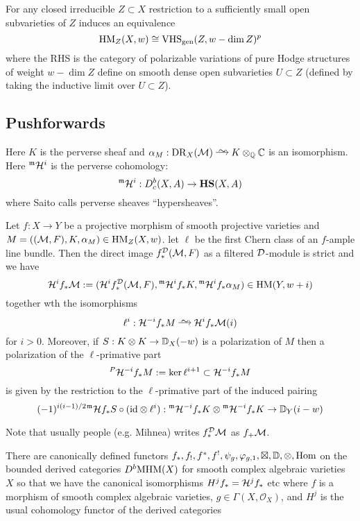 \documentclass[12pt]{article}
\newcommand{\cO}{\mathcal{O}}
\begin{document}
\begin{theorem}
For any closed irreducible $Z \subset X$ restriction to a sufficiently small open subvarieties of $Z$ induces an equivalence
\[ \mathrm{HM}_Z(X, w) \cong \mathrm{VHS}_{\text{gen}}(Z, w - \dim{Z})^p \]
where the RHS is the category of polarizable variations of pure Hodge structures of weight $w - \dim{Z}$ define on smooth dense open subvarieties $U \subset Z$ (defined by taking the inductive limit over $U \subset Z$).
\end{theorem}

\subsection{Pushforwards}

Here $K$ is the perverse sheaf and $\alpha_M : \DR_X(\cM) \iso K \ot_{\Q} \CC$ is an isomorphism. Here ${}^{\mathfrak{m}} \mathcal{H}^i$ is the perverse cohomology:
\[ {}^{\mathfrak{m}} \mathcal{H}^i : D_c^b(X, A) \to \mathbf{HS}(X, A) \]
where Saito calls perverse sheaves ``hypersheaves''. 

\begin{theorem}
Let $f : X \to Y$ be a projective morphism of smooth projective varieties and $M = ((\mathcal{M}, F), K, \alpha_M) \in \mathrm{HM}_Z(X, w)$. let $\ell$ be the first Chern class of an $f$-ample line bundle. Then the direct image $f_*^{\mathcal{D}}(\mathcal{M}, F)$ as a filtered $\mathcal{D}$-module is strict and we have
\[ \mathcal{H}^i f_* \mathcal{M} := (\mathcal{H}^i f_*^{\mathcal{D}} (\mathcal{M}, F), {}^{\mathfrak{m}} \mathcal{H}^i f_* K, {}^{\mathfrak{m}} \mathcal{H}^i f_* \alpha_M) \in \mathrm{HM}(Y, w + i) \]
together wth the isomorphisms
\[ \ell^i : \cH^{-i} f_* M \iso \cH^i f_* \cM(i) \]
for $i > 0$. Moreover, if $S : K \otimes K \to \mathbb{D}_X(-w)$ is a polarization of $M$ then a polarization of the $\ell$-primative part 
\[ {}^P \mathcal{H}^{-i} f_* M := \ker{\ell^{i+1}} \subset \mathcal{H}^{-i} f_* M \]
is given by the restriction to the $\ell$-primative part of the induced pairing
\[ (-1)^{i (i-1)/2} {}^{\mathfrak{m}} \mathcal{H} f_* S \circ (\mathrm{id} \otimes \ell^i) : {}^{\mathfrak{m}} \mathcal{H}^{-i} f_* K \otimes {}^{\mathfrak{m}} \mathcal{H}^{-i} f_* K \to \mathbb{D}_Y(i-w) \] 
\end{theorem}

\begin{rmk}
Note that usually people (e.g. Mihnea) writes $f_*^{\mathcal{D}} \mathcal{M}$ as $f_+ \mathcal{M}$.
\end{rmk}


\begin{theorem}[Saito, 3.6]
There are canonically defined functors $f_*, f_{!}, f^*, f^{!}, \psi_g, \varphi_{g,1}, \boxtimes, \mathbb{D}, \otimes, \mathrm{Hom}$ on the bounded derived categories $D^b \mathrm{MHM}(X)$ for smooth complex algebraic varieties $X$ so that we have the canonical isomorphisms $H^j f_* = \mathcal{H}^j f_*$ etc where $f$ is a morphism of smooth complex algebraic varieties, $g \in \Gamma(X, \cO_X)$, and $H^j$ is the usual cohomology functor of the derived categories 
\end{theorem}
\end{document}
